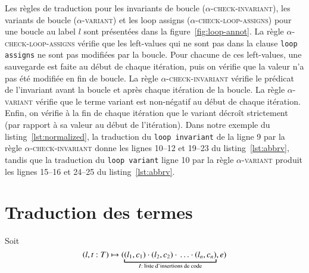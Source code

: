 Les règles de traduction pour les invariants de boucle
(\textsc{$\alpha$-check-invariant}), les variants de boucle
(\textsc{$\alpha$-variant}) et les loop assigns
(\textsc{$\alpha$-check-loop-assigns})
pour une boucle au label $l$ sont présentées dans la
figure~\ref{fig:loop-annot}.
La règle \textsc{$\alpha$-check-loop-assigns} vérifie que les left-values qui ne
sont pas dans la clause \lstinline'loop assigns' ne sont pas modifiées par la
boucle.
Pour chacune de ces left-values, une sauvegarde est faite au début de chaque
itération, puis on vérifie que la valeur n'a pas été modifiée en fin de boucle.
La règle \textsc{$\alpha$-check-invariant} vérifie le prédicat de l'invariant
avant la boucle et après chaque itération de la boucle.
La règle \textsc{$\alpha$-variant} vérifie que le terme variant est non-négatif
au début de chaque itération.
Enfin, on vérifie à la fin de chaque itération que le variant décroît
strictement (par rapport à sa valeur au début de l'itération).
Dans notre exemple du listing~\ref{lst:normalized}, la traduction du
\lstinline'loop invariant' de la ligne 9 par la règle
\textsc{$\alpha$-check-invariant} donne les lignes 10--12 et 19--23 du
listing~\ref{lst:abbrv}, tandis que la traduction du \lstinline'loop variant'
ligne 10 par la règle \textsc{$\alpha$-variant} produit les lignes 15--16 et
24--25 du listing~\ref{lst:abbrv}.




\section{Traduction des termes \eacsl}
\label{sec:term}



Soit
\[
(l, t:T) \rulearrow (\underbracket{(l_1, c_1) \concat (l_2, c_2) \concat \ldots
  \concat (l_n, c_n)}_{I : \text{ liste d'insertions de code}}, e)
\]

